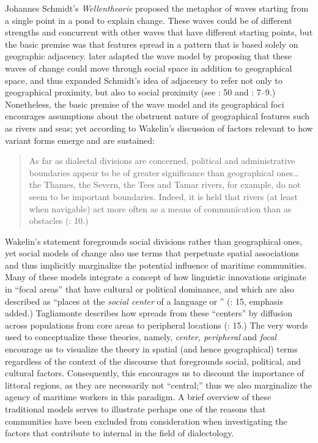 Johannes Schmidt’s \citeyear*{Schmidt1872} \textit{Wellentheorie} proposed the metaphor of waves starting from a single point in a pond to explain  change. These waves could be of different strengths and concurrent with other waves that have different starting points, but the basic premise was that  features spread in a pattern that is based solely on geographic adjacency. \citet{BaileyEtAl1993} later adapted the wave model by proposing that these waves of change could move through social space in addition to geographical space, and thus expanded Schmidt’s idea of adjacency to refer not only to geographical proximity, but also to social proximity (see \citealt{Petyt1980}: 50 and \citealt{AuerEtAl2005}: 7--9.) Nonetheless, the basic premise of the wave model and its geographical foci encourages assumptions about the obstruent nature of geographical features such as rivers and seas; yet according to Wakelin’s discussion of factors relevant to how variant  forms emerge and are sustained: 

\begin{quotation}
As far as dialectal divisions are concerned, political and administrative boundaries appear to be of greater significance than geographical ones… the Thames, the Severn, the Tees and Tamar rivers, for example, do not seem to be important  boundaries. Indeed, it is held that rivers (at least when navigable) act more often as a means of communication than as obstacles (\citealt{Wakelin1977}: 10.)\end{quotation}

Wakelin’s statement foregrounds social divisions rather than geographical ones, yet social models of  change also use terms that perpetuate spatial associations and thus implicitly marginalize the potential influence of maritime communities. Many of these models integrate a concept of how linguistic innovations originate in “focal areas” that have cultural or political dominance, and which are also described as “places at the \textit{social center} of a language or ” (\citealt{Tagliamonte2013}: 15, emphasis added.) Tagliamonte describes how  spreads from these “centers” by diffusion across populations from core areas to peripheral locations (\citeyear*{Tagliamonte2013}: 15.) The very words used to conceptualize these theories, namely, \textit{center, peripheral} and \textit{focal} encourage us to visualize the theory in spatial (and hence geographical) terms regardless of the context of the discourse that foregrounds social, political, and cultural factors. Consequently, this encourages us to discount the importance of littoral regions, as they are necessarily not “central;” thus we also marginalize the agency of maritime workers in this paradigm. A brief overview of these traditional models serves to illustrate perhaps one of the reasons that  communities have been excluded from consideration when investigating the factors that contribute to internal  in the field of dialectology. 

